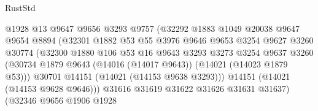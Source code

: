 \begin{lexlean}{RustStd}
\begin{coremodule}
                                    @1928
                                    @13
                                    @9647
                                    @9656
                                    @3293
                                    @9757
                                    (@32292
                                      @1883
                                      @1049
                                      @20038
                                      @9647
                                      @9654
                                      @8894
                                      (@32301
                                        @1882
                                        @53
                                        @55
                                        @3976
                                        @9646
                                        @9653
                                        @3254
                                        @9627
                                        @3260
                                        @30774
                                        (@32300
                                          @1880
                                          @106
                                          @53
                                          @16
                                          @9643
                                          @3293
                                          @3273
                                          @3254
                                          @9637
                                          @3260
                                          (@30734
                                            @1879
                                            @9643
                                            (@14016 (@14017 @9643))
                                            (@14021 (@14023 @1879 @53)))
                                          @30701
                                          @14151
                                          (@14021 (@14153 @9638 @3293)))
                                        @14151
                                        (@14021 (@14153 @9628 @9646)))
                                      @31616
                                      @31619
                                      @31622
                                      @31626
                                      @31631
                                      @31637)
                                    (@32346
                                      @9656
                                      @1906
                                      @1928

\end{coremodule}
\end{lexlean}
